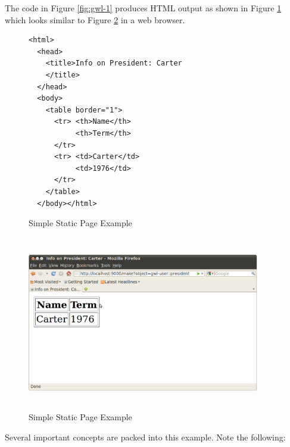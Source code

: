 \documentclass [11pt]{book}
\begin{document}
The code in Figure 
\ref{fig:gwl-1} produces HTML output as shown in Figure 
\ref{fig:gwl-1-html} which looks similar to Figure 
\ref{fig:gwl-1-image} in a web browser.
\begin{figure}
\begin{lrbox}{\boxedverb}
\begin{minipage}{\linewidth}
\tiny{

\begin{verbatim}
<html>
  <head>
    <title>Info on President: Carter
    </title>
  </head>
  <body>
    <table border="1">
      <tr> <th>Name</th>
           <th>Term</th>
      </tr>
      <tr> <td>Carter</td>
           <td>1976</td>
      </tr>
    </table>
  </body></html>

\end{verbatim}}
\end{minipage}
\end{lrbox}
\fbox{\usebox{\boxedverb}}

\caption{Simple Static Page Example}

\label{fig:gwl-1-html}

\end{figure}

\begin{figure}
\begin{center}
\includegraphics[width=4in,height=3in]{../images/gwl-1.png}
\end{center}

\caption{Simple Static Page Example}

\label{fig:gwl-1-image}

\end{figure}




Several important concepts are packed into this example. Note the following:
\end{document}
